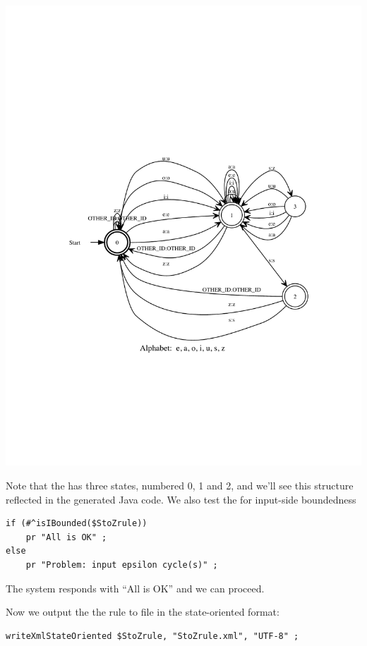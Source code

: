\begin{center}
\includegraphics[scale=0.9]{images/StoZrule.pdf}
\end{center}


\noindent
Note that the \fsm{} has three states, numbered 0, 1 and 2, and we'll see this structure reflected in the generated Java code.
We also test the \fsm{} for input-side boundedness

\begin{Verbatim}
if (#^isIBounded($StoZrule))
    pr "All is OK" ;
else
    pr "Problem: input epsilon cycle(s)" ;
\end{Verbatim}

\noindent
The system responds with ``All is OK'' and we can proceed.

Now we output the the rule \fsm{} to file in the state-oriented \xml{} format:

\begin{Verbatim}
writeXmlStateOriented $StoZrule, "StoZrule.xml", "UTF-8" ;
\end{Verbatim}

